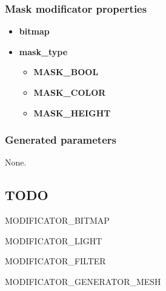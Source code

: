 \documentclass[9pt]{article}
\begin{document}
\subsubsection*{Mask modificator properties}
\begin{itemize}
\item{\bf bitmap}
\item{\bf mask\_type}
\begin{itemize}
\item{\bf MASK\_BOOL}
\item{\bf MASK\_COLOR}
\item{\bf MASK\_HEIGHT}
\end{itemize}
\end{itemize}

\subsubsection*{Generated parameters}

None.

\subsection{TODO}

MODIFICATOR\_BITMAP

MODIFICATOR\_LIGHT

MODIFICATOR\_FILTER

MODIFICATOR\_GENERATOR\_MESH
\end{document}
